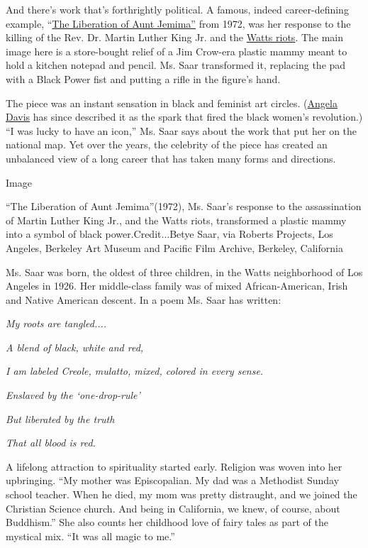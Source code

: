And there's work that's forthrightly political. A famous, indeed
career-defining example,
``\href{http://revolution.berkeley.edu/liberation-aunt-jemima/}{The
Liberation of Aunt Jemima''} from 1972, was her response to the killing
of the Rev. Dr. Martin Luther King Jr. and the
\href{https://www.nytimes.com/2015/08/11/us/50-years-after-watts-riots-a-recovery-is-in-progress.html}{Watts
riots}. The main image here is a store-bought relief of a Jim Crow-era
plastic mammy meant to hold a kitchen notepad and pencil. Ms. Saar
transformed it, replacing the pad with a Black Power fist and putting a
rifle in the figure's hand.

The piece was an instant sensation in black and feminist art circles.
(\href{https://www.history.com/topics/black-history/angela-davis}{Angela
Davis} has since described it as the spark that fired the black women's
revolution.) ``I was lucky to have an icon,'' Ms. Saar says about the
work that put her on the national map. Yet over the years, the celebrity
of the piece has created an unbalanced view of a long career that has
taken many forms and directions.

Image

``The Liberation of Aunt Jemima''(1972), Ms. Saar's response to the
assassination of Martin Luther King Jr., and the Watts riots,
transformed a plastic mammy into a symbol of black power.Credit...Betye
Saar, via Roberts Projects, Los Angeles, Berkeley Art Museum and Pacific
Film Archive, Berkeley, California

Ms. Saar was born, the oldest of three children, in the Watts
neighborhood of Los Angeles in 1926. Her middle-class family was of
mixed African-American, Irish and Native American descent. In a poem Ms.
Saar has written:

\emph{My roots are tangled....}

\emph{A blend of black, white and red,}

\emph{I am labeled Creole, mulatto, mixed, colored in every sense.}

\emph{Enslaved by the `one-drop-rule'}

\emph{But liberated by the truth}

\emph{That all blood is red.}

A lifelong attraction to spirituality started early. Religion was woven
into her upbringing. ``My mother was Episcopalian. My dad was a
Methodist Sunday school teacher. When he died, my mom was pretty
distraught, and we joined the Christian Science church. And being in
California, we knew, of course, about Buddhism.'' She also counts her
childhood love of fairy tales as part of the mystical mix. ``It was all
magic to me.''

